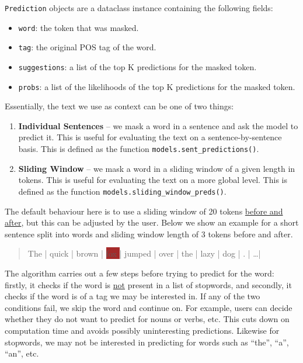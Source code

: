     \texttt{Prediction} objects are a dataclass instance containing the following fields:
    \begin{itemize}
        \item \texttt{word}: the token that was masked.
        \item \texttt{tag}: the original POS tag of the word.
        \item \texttt{suggestions}: a list of the top K predictions for the masked token.
        \item \texttt{probs}: a list of the likelihoods of the top K predictions for the masked token.
    \end{itemize}

    Essentially, the text we use as context can be one of two things: 

    \begin{enumerate}
        \item \textbf{Individual Sentences} -- we mask a word in a sentence and ask the model to predict it. This is useful for evaluating the text on a sentence-by-sentence basis. This is defined as the function \texttt{models.sent\_predictions()}.
        \item \textbf{Sliding Window} -- we mask a word in a sliding window of a given length in tokens. This is useful for evaluating the text on a more global level. This is defined as the function \texttt{models.sliding\_window\_preds()}.
    \end{enumerate}
    
    The default behaviour here is to use a sliding window of 20 tokens \underline{before and after}, but this can be adjusted by the user. Below we show an example for a short sentence split into words and sliding window length of 3 tokens before and after. 
    \begin{quotation}
        The  | quick | brown | \colorbox{brown}{ fox } | jumped | over | the | lazy | dog |   .   |   \dots   |
    \end{quotation}

    The algorithm carries out a few steps before trying to predict for the word: firstly, it checks if the word is \underline{not} present in a list of stopwords, and secondly, it checks if the word is of a tag we may be interested in. If any of the two conditions fail, we skip the word and continue on. For example, users can decide whether they do not want to predict for nouns or verbs, etc. This cuts down on computation time and avoids possibly uninteresting predictions. Likewise for stopwords, we may not be interested in predicting for words such as ``the'', ``a'', ``an'', etc.

